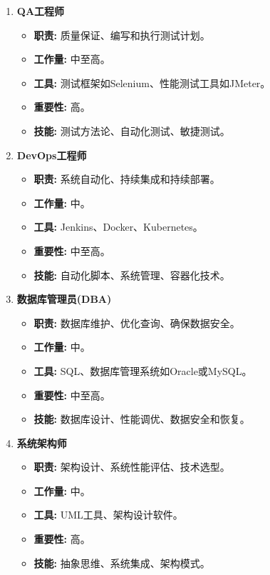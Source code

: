 \documentclass{ctexart}
\begin{document}
\begin{enumerate}
  \item \textbf{QA工程师}
  \begin{itemize}
    \item \textbf{职责:} 质量保证、编写和执行测试计划。
    \item \textbf{工作量:} 中至高。
    \item \textbf{工具:} 测试框架如Selenium、性能测试工具如JMeter。
    \item \textbf{重要性:} 高。
    \item \textbf{技能:} 测试方法论、自动化测试、敏捷测试。
  \end{itemize}

  \item \textbf{DevOps工程师}
  \begin{itemize}
    \item \textbf{职责:} 系统自动化、持续集成和持续部署。
    \item \textbf{工作量:} 中。
    \item \textbf{工具:} Jenkins、Docker、Kubernetes。
    \item \textbf{重要性:} 中至高。
    \item \textbf{技能:} 自动化脚本、系统管理、容器化技术。
  \end{itemize}

  \item \textbf{数据库管理员(DBA)}
  \begin{itemize}
    \item \textbf{职责:} 数据库维护、优化查询、确保数据安全。
    \item \textbf{工作量:} 中。
    \item \textbf{工具:} SQL、数据库管理系统如Oracle或MySQL。
    \item \textbf{重要性:} 中至高。
    \item \textbf{技能:} 数据库设计、性能调优、数据安全和恢复。
  \end{itemize}

  \item \textbf{系统架构师}
  \begin{itemize}
    \item \textbf{职责:} 架构设计、系统性能评估、技术选型。
    \item \textbf{工作量:} 中。
    \item \textbf{工具:} UML工具、架构设计软件。
    \item \textbf{重要性:} 高。
    \item \textbf{技能:} 抽象思维、系统集成、架构模式。
  \end{itemize}
\end{enumerate}
\end{document}
